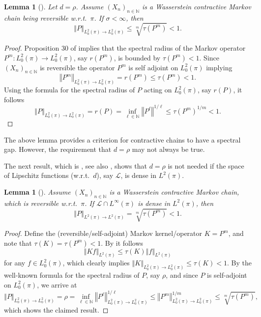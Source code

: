 \documentclass[12pt]{article}
\theoremstyle{plain}
\newtheorem{lem}[thm]{Lemma}
\newcommand{\norm}[1]{\left\Vert #1 \right\Vert}
\newcommand{\N}{\mathbb{N}}
\begin{document}
{\begin{lem}[{\cite[Proposition 30]{ollivier2009ricci}}]\label{lem:contraction_implies_spectral_gap}
	Let $d = \rho$.
	Assume $(X_n)_{n \in \N}$ is a Wasserstein contractive Markov chain being reversible w.r.t.~$\pi$.
	If $\sigma < \infty$, then 
	\[
	\norm{P}_{L^2_0(\pi) \to L^2_0(\pi)} \leq \sqrt[m]{\tau(P^m)} <1. 
	\] 
\end{lem}

\begin{proof}
	Proposition 30 of \cite{ollivier2009ricci} implies that the spectral radius of the Markov operator $P^m \colon L^2_0(\pi ) \to L^2_0(\pi)$, say $r(P^m)$, is bounded by $\tau(P^m)<1$. 
	Since $(X_n)_{n \in \N}$ is reversible the operator $P^m$ is self adjoint on $L^2_0(\pi)$ implying
	\[
	\norm{P^m}_{L^2_0(\pi) \to L^2_0(\pi)} = r(P^m) \leq \tau(P^m) <1.
	\]
	Using the formula for the spectral radius of $P$ acting on $L^2_0(\pi)$, say $r(P)$, it follows 
	\[
	\norm{P}_{L^2_0(\pi) \to L^2_0(\pi)} = r(P) = \inf_{\ell \in \N} \norm{P^\ell}^{1/\ell} \leq \tau(P^m)^{1/m}<1.
	\]
\end{proof}

The above lemma provides a criterion for contractive chains to have a spectral gap. 
However, the requirement that $d = \rho$ may not always be true.

The next result, which is \cite[Proposition 2.8]{hairer2014spectral}, see also \cite{rockner2001weak}, shows that $d = \rho$ is not needed if the space of Lipschitz functions (w.r.t.~$d$), say $\mathscr{L}$, is dense in $L^2(\pi)$. 

\begin{lem}[{\cite[Proposition 2.8]{hairer2014spectral}}]\label{lem:contraction_implies_spectral_gap_2}
	Assume $(X_n)_{n \in \N}$ is a Wasserstein contractive Markov chain, which is reversible w.r.t.~$\pi$.
	If $\mathscr{L} \cap L^\infty(\pi)$ is dense in $L^2(\pi)$, then 
	\[
	\norm{P}_{L^2(\pi) \to L^2(\pi)} = \sqrt[m]{\tau(P^m)} < 1. 
	\]
\end{lem}

\begin{proof}
	Define the (reversible/self-adjoint) Markov kernel/operator $K= P^m$, and note that $\tau(K) = \tau(P^m)<1$.
	By \cite[Proposition 2.8]{hairer2014spectral} it follows 
	\[
	\norm{K f}_{L^2(\pi) } \leq \tau(K) \norm{f}_{L^2(\pi)}
	\]
	for any $f \in L^2_0(\pi)$, which clearly implies $\norm{K}_{L^2_0(\pi) \to L^2_0(\pi)} \leq \tau(K)< 1$. 
	By the well-known formula for the spectral radius of $P$, say $\rho$, and since $P$ is self-adjoint on $L^2_0(\pi)$, we arrive at 
	\[
	\norm{P}_{L^2_0(\pi) \to L^2_0(\pi)} = \rho = \inf_{\ell \in \N} \norm{P^\ell}_{L^2_0(\pi) \to L^2_0(\pi)}^{1/\ell} \leq \norm{P^m}_{L^2_0(\pi) \to L^2_0(\pi)}^{1/m} \leq \sqrt[m]{\tau(P^m)}, 
	\]
	which shows the claimed result. 
\end{proof}




}
\end{document}
